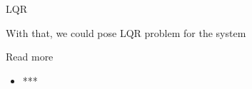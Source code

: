 \documentclass{beamer}
\begin{document}
\begin{frame}{LQR}
	\begin{flushleft}
		
		With that, we could pose LQR problem for the system 
		
	\end{flushleft}
\end{frame}



\begin{frame}{Read more}
	
	\begin{itemize}
		
		\item ***
		
	\end{itemize}
	
\end{frame}



\myqrframe
\end{document}
